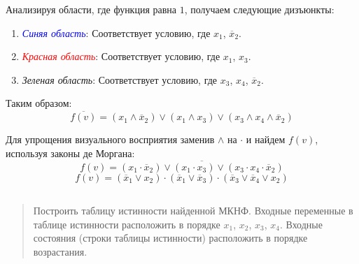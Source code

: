 Анализируя области, где функция равна $1$, получаем следующие дизъюнкты:
\begin{enumerate}
    \item \textit{\textcolor{blue}{Синяя область}}: Соответствует условию, где $x_1$, $\overline x_2$.
    \item \textit{\textcolor{red}{Красная область}}: Соответствует условию, где $x_1$, $x_3$.
    \item \textit{\textcolor{green!60!black}{Зеленая область}}: Соответствует условию, где $x_3$, $x_4$, $\overline x_2$.
\end{enumerate}

Таким образом:
\begin{equation}
    \overline{f(v)} = (x_1 \land \overline x_2) \lor (x_1 \land x_3) \lor (x_3 \land x_4 \land \overline x_2)
    \label{complex_iverted_f}
\end{equation}

Для упрощения визуального восприятия заменив $\land$ на $\cdot$ и найдем $f(v)$, используя законы де Моргана:
\begin{equation}
    f(v) = \overline{(x_1 \cdot \overline x_2) \lor (x_1 \cdot x_3) \lor (x_3 \cdot x_4 \cdot \overline x_2)}
\end{equation}
\begin{equation}
    \boxed{f(v) = (\overline x_1 \lor x_2) \cdot (\overline x_1 \lor \overline x_3) \cdot (\overline x_3 \lor \overline x_4 \lor x_2)}
\end{equation}

\subsection*{  }
\begin{quote}
    Построить таблицу истинности найденной МКНФ. Входные переменные в таблице истинности расположить в порядке $x_1$, $x_2$, $x_3$, $x_4$. Входные состояния (строки таблицы истинности) расположить в порядке возрастания.
\end{quote}


